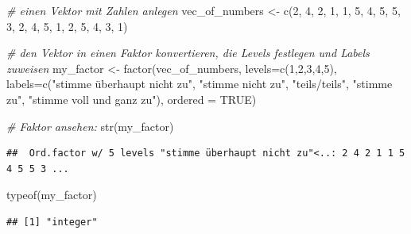 \documentclass[
]{book}
\newenvironment{Shaded}{\begin{snugshade}}{\end{snugshade}}
\newcommand{\AttributeTok}[1]{\textcolor[rgb]{0.77,0.63,0.00}{#1}}
\newcommand{\CommentTok}[1]{\textcolor[rgb]{0.56,0.35,0.01}{\textit{#1}}}
\newcommand{\ConstantTok}[1]{\textcolor[rgb]{0.00,0.00,0.00}{#1}}
\newcommand{\DecValTok}[1]{\textcolor[rgb]{0.00,0.00,0.81}{#1}}
\newcommand{\FunctionTok}[1]{\textcolor[rgb]{0.00,0.00,0.00}{#1}}
\newcommand{\NormalTok}[1]{#1}
\newcommand{\OtherTok}[1]{\textcolor[rgb]{0.56,0.35,0.01}{#1}}
\newcommand{\StringTok}[1]{\textcolor[rgb]{0.31,0.60,0.02}{#1}}
\begin{document}
\begin{Shaded}
\begin{Highlighting}[]
\CommentTok{\# einen Vektor mit Zahlen anlegen}
\NormalTok{vec\_of\_numbers }\OtherTok{\textless{}{-}} \FunctionTok{c}\NormalTok{(}\DecValTok{2}\NormalTok{, }\DecValTok{4}\NormalTok{, }\DecValTok{2}\NormalTok{, }\DecValTok{1}\NormalTok{, }\DecValTok{1}\NormalTok{, }\DecValTok{5}\NormalTok{, }\DecValTok{4}\NormalTok{, }\DecValTok{5}\NormalTok{, }\DecValTok{5}\NormalTok{, }\DecValTok{3}\NormalTok{, }\DecValTok{2}\NormalTok{, }\DecValTok{4}\NormalTok{, }\DecValTok{5}\NormalTok{, }\DecValTok{1}\NormalTok{, }\DecValTok{2}\NormalTok{, }\DecValTok{5}\NormalTok{, }\DecValTok{4}\NormalTok{, }\DecValTok{3}\NormalTok{, }\DecValTok{1}\NormalTok{)}

\CommentTok{\# den Vektor in einen Faktor konvertieren, die Levels festlegen und Labels zuweisen}
\NormalTok{my\_factor }\OtherTok{\textless{}{-}} \FunctionTok{factor}\NormalTok{(vec\_of\_numbers, }
             \AttributeTok{levels=}\FunctionTok{c}\NormalTok{(}\DecValTok{1}\NormalTok{,}\DecValTok{2}\NormalTok{,}\DecValTok{3}\NormalTok{,}\DecValTok{4}\NormalTok{,}\DecValTok{5}\NormalTok{),}
             \AttributeTok{labels=}\FunctionTok{c}\NormalTok{(}\StringTok{"stimme überhaupt nicht zu"}\NormalTok{, }
                      \StringTok{"stimme nicht zu"}\NormalTok{, }
                      \StringTok{"teils/teils"}\NormalTok{, }
                      \StringTok{"stimme zu"}\NormalTok{, }
                      \StringTok{"stimme voll und ganz zu"}\NormalTok{),}
              \AttributeTok{ordered =} \ConstantTok{TRUE}\NormalTok{)}
                      
\CommentTok{\# Faktor ansehen:}
\FunctionTok{str}\NormalTok{(my\_factor)}
\end{Highlighting}
\end{Shaded}

\begin{verbatim}
##  Ord.factor w/ 5 levels "stimme überhaupt nicht zu"<..: 2 4 2 1 1 5 4 5 5 3 ...
\end{verbatim}

\begin{Shaded}
\begin{Highlighting}[]
\FunctionTok{typeof}\NormalTok{(my\_factor)}
\end{Highlighting}
\end{Shaded}

\begin{verbatim}
## [1] "integer"
\end{verbatim}
\end{document}
